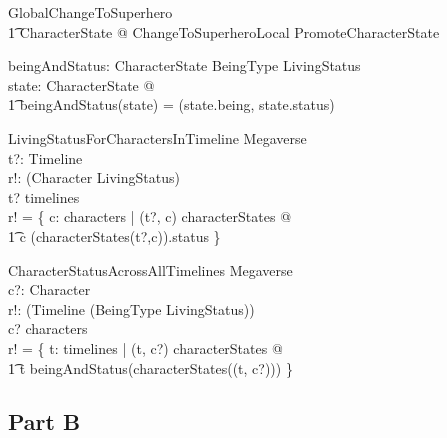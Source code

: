 \documentclass{article}
\begin{document}
\begin{zed}
GlobalChangeToSuperhero  \\
\t1 \exists \Delta CharacterState @ ChangeToSuperheroLocal \land PromoteCharacterState \\
\end{zed}
      
\begin{axdef}
beingAndStatus: CharacterState \fun BeingType \cross LivingStatus \\
\where
\forall state: CharacterState @ \\
\t1 beingAndStatus(state) = (state.being, state.status) \\
\end{axdef}

\begin{schema}{LivingStatusForCharactersInTimeline}
\Xi Megaverse \\
t?: Timeline \\ 
r!: \power (Character \cross LivingStatus) \\
\where 
t? \in timelines \\
r! = \{ c: characters | (t?, c) \in \dom characterStates @ \\
\t1 c \mapsto (characterStates(t?,c)).status
\} \\ 
\end{schema}

\begin{schema}{CharacterStatusAcrossAllTimelines}
\Xi Megaverse \\
c?: Character \\ 
r!: \power (Timeline \cross (BeingType \cross LivingStatus)) \\
\where 
c? \in characters \\
r! = \{ t: timelines | (t, c?) \in \dom characterStates @  \\
\t1 t \mapsto beingAndStatus(characterStates((t, c?)))   
\} \\ 
\end{schema}

\pagebreak
\subsection*{Part B}
\end{document}
